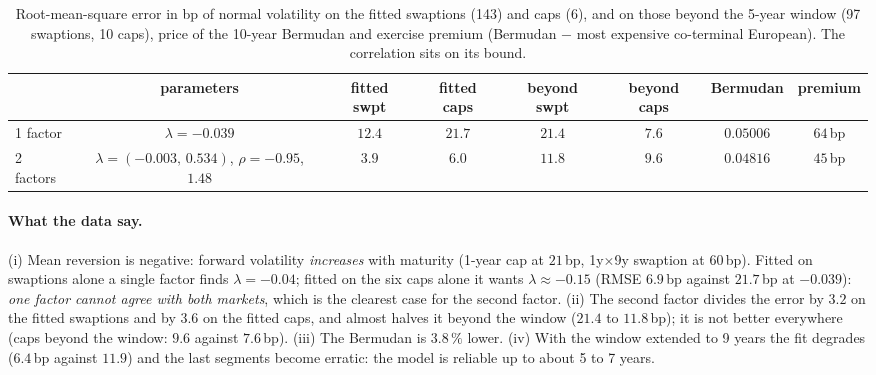 \documentclass[11pt,a4paper]{article}
\theoremstyle{definition}
\theoremstyle{remark}
\begin{document}
\begin{table}[ht]\centering\small
\begin{tabular}{lccccccc}\toprule
 & parameters & fitted swpt & fitted caps & beyond swpt & beyond caps & Bermudan & premium\\\midrule
1 factor & $\lambda=-0.039$ & $12.4$ & $21.7$ & $21.4$ & $7.6$ & $0.05006$ & $64\,$bp\\
2 factors & $\lambda=(-0.003,\,0.534)$, $\rho=-0.95$, $1.48$ & $3.9$ & $6.0$ & $11.8$ & $9.6$ & $0.04816$ & $45\,$bp\\\bottomrule
\end{tabular}
\caption{Root-mean-square error in bp of normal volatility on the fitted swaptions (143) and caps (6), and on those beyond the 5-year window (97 swaptions, 10 caps),
price of the 10-year Bermudan and exercise premium (Bermudan $-$ most expensive co-terminal European). The correlation sits on its bound.}\label{tab:fit2f}
\end{table}

\paragraph{What the data say.} (i) Mean reversion is negative: forward volatility \emph{increases} with maturity (1-year cap at $21\,$bp, 1y$\times$9y swaption at $60\,$bp).
Fitted on swaptions alone a single factor finds $\lambda=-0.04$; fitted on the six caps alone it wants $\lambda\approx-0.15$ (RMSE $6.9\,$bp against
$21.7\,$bp at $-0.039$): \emph{one factor cannot agree with both markets}, which is the clearest case for the second factor. (ii) The second factor
divides the error by $3.2$ on the fitted swaptions and by $3.6$ on the fitted caps, and almost halves it beyond the window ($21.4$ to $11.8\,$bp); it is not better
everywhere (caps beyond the window: $9.6$ against $7.6\,$bp). (iii) The Bermudan is $3.8\,\%$ lower. (iv) With the window extended to 9 years the fit degrades
($6.4\,$bp against $11.9$) and the last segments become erratic: the model is reliable up to about 5 to 7 years.
\end{document}
